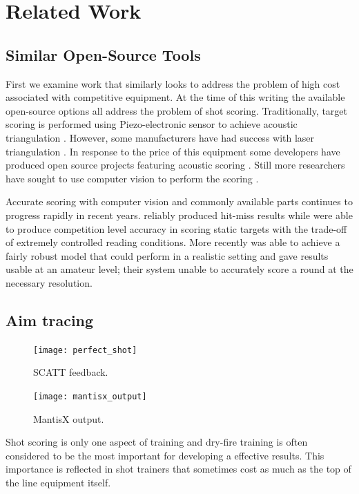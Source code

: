 \documentclass[conference]{IEEEtran}
\begin{document}
\section{Related Work}

\subsection{Similar Open-Source Tools}

First we examine work that similarly looks to address the problem of high cost associated with competitive equipment.
At the time of this writing the available open-source options all address the problem of shot scoring.
Traditionally, target scoring is performed using Piezo-electronic sensor to achieve acoustic triangulation \cite{Anderson2018}.
However, some manufacturers have had success with laser triangulation \cite{SUIS}.
In response to the price of this equipment some developers have produced open source projects featuring acoustic scoring \cite{etarg, freetarget}.
Still more researchers have sought to use computer vision to perform the scoring \cite{Rudzinski2012, Stenhager2021}.

Accurate scoring with computer vision and commonly available parts continues to progress rapidly in recent years.
\cite{Ye2011} reliably produced  hit-miss results while \cite{Rudzinski2012} were able to produce competition level accuracy in scoring static targets with the trade-off of extremely controlled reading conditions.
More recently \cite{Stenhager2021} was able to achieve a fairly robust model that could perform in a realistic setting and gave results usable at an amateur level; their system unable to accurately score a round at the necessary resolution.

\subsection{Aim tracing}

\begin{figure}[]
	\centering
	\texttt{[image: perfect\_shot]}
	\caption{SCATT \cite{scatt} feedback.}
	\label{fig:SCATT_Example}
\end{figure}

\begin{figure}[]
	\centering
	\texttt{[image: mantisx\_output]}
	\caption{MantisX \cite{mantisx} output.}
	\label{fig:MantisX_Example}
\end{figure}

Shot scoring is only one aspect of training and dry-fire training is often 
considered to be the most important for developing a effective results.
\cite{Potter2017}
This importance is reflected in shot trainers that sometimes cost as much as the top of the line equipment itself.
\cite{scatt, noptel}
\end{document}
